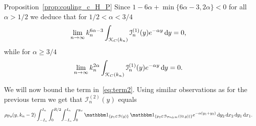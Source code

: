 \begin{proofof}{Proposition~\ref{prop:couling_c_H_P}}
Since $1 - 6\alpha + \min\{6\alpha - 3, 2\alpha\} < 0$ for all $\alpha > 1/2$ we deduce that for $1/2 < \alpha < 3/4$
\[
	\lim_{n \to \infty} k_n^{6\alpha - 3} 
	\int_{{\mathcal K}_{C}(k_n)} \mathcal{I}_n^{(1)}(y) e^{-\alpha y} \operatorname{\mathrm{d}\hspace{-2pt}} y = 0,
\]
while for $\alpha \ge 3/4$
\[
	\lim_{n \to \infty} k_n^{2\alpha}  
		\int_{{\mathcal K}_{C}(k_n)} \mathcal{I}_n^{(1)}(y) e^{-\alpha y} \operatorname{\mathrm{d}\hspace{-2pt}} y = 0.
\]

We will now bound the term in~\eqref{eq:term2}. Using similar observations as for the previous term we get that $\mathcal{I}_n^{(2)}(y)$ equals
\[
	 \rho_{\Po}(y,k_n-2) \int_{-I_n}^{I_n} \int_0^{R/2} \hspace{-2pt} \int_{-I_n}^{I_n} \int_0^{y_\omega}
	 \ind{p_1 \in \BallHyp{y}} \, \ind{p_2 \in \BallSym{(0,y)}} e^{-\alpha(y_1 + y_2)} \dd y_2 
	 \dd x_2 \dd y_1 \dd x_1.
\]


\end{proofof}
